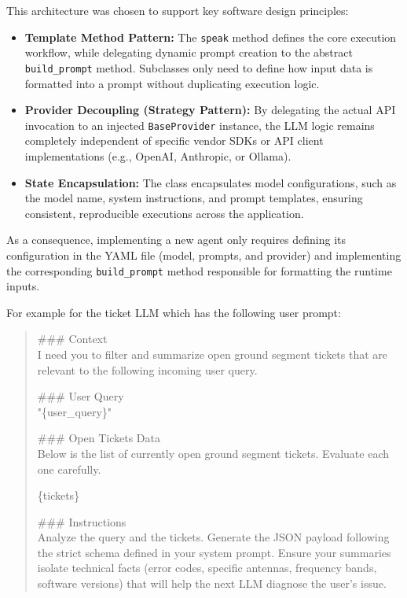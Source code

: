This architecture was chosen to support key software design principles:
\begin{itemize}
    \item \textbf{Template Method Pattern:} The \texttt{speak} method defines the core execution workflow, while delegating dynamic prompt creation to the abstract \texttt{build\_prompt} method. Subclasses only need to define how input data is formatted into a prompt without duplicating execution logic.
    \item \textbf{Provider Decoupling (Strategy Pattern):} By delegating the actual API invocation to an injected \texttt{BaseProvider} instance, the LLM logic remains completely independent of specific vendor SDKs or API client implementations (e.g., OpenAI, Anthropic, or Ollama).
    \item \textbf{State Encapsulation:} The class encapsulates model configurations, such as the model name, system instructions, and prompt templates, ensuring consistent, reproducible executions across the application.
\end{itemize}

As a consequence, implementing a new agent only requires defining its configuration in the YAML file (model, prompts, and provider) and implementing the corresponding \texttt{build\_prompt} method responsible for formatting the runtime inputs.

For example for the ticket LLM which has the following user prompt:
\begin{quote}
\ttfamily\small
\#\#\# Context \\
I need you to filter and summarize open ground segment tickets that are relevant to the following incoming user query. 

\vspace{0.5em}
\#\#\# User Query \\
"\{user\_query\}"

\vspace{0.5em}
\#\#\# Open Tickets Data \\
Below is the list of currently open ground segment tickets. Evaluate each one carefully.

\{tickets\}

\vspace{0.5em}
\#\#\# Instructions \\
Analyze the query and the tickets. Generate the JSON payload following the strict schema defined in your system prompt. Ensure your summaries isolate technical facts (error codes, specific antennas, frequency bands, software versions) that will help the next LLM diagnose the user's issue.
\end{quote}


